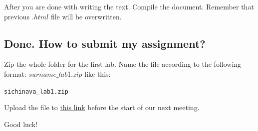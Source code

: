 \documentclass{article}\usepackage[]{graphicx}\usepackage[]{color}
\makeatletter
\newcommand{\hlstd}[1]{\textcolor[rgb]{0.345,0.345,0.345}{#1}}%
\newenvironment{kframe}{%
 \def\at@end@of@kframe{}%
 \ifinner\ifhmode%
  \def\at@end@of@kframe{\end{minipage}}%
  \begin{minipage}{\columnwidth}%
 \fi\fi%
 \def\FrameCommand##1{\hskip\@totalleftmargin \hskip-\fboxsep
 \colorbox{shadecolor}{##1}\hskip-\fboxsep
     \hskip-\linewidth \hskip-\@totalleftmargin \hskip\columnwidth}%
 \MakeFramed {\advance\hsize-\width
   \@totalleftmargin\z@ \linewidth\hsize
   \@setminipage}}%
 {\par\unskip\endMakeFramed%
 \at@end@of@kframe}
\newenvironment{knitrout}{}{} %
\makeatother
\begin{document}
After you are done with writing the text. Compile the document. Remember that previous $.html$ file will be overwritten.

\subsection*{Done. How to submit my assignment?}

Zip the whole folder for the first lab. Name the file according to the following format: $surname\_lab1.zip$ like this:

\begin{knitrout}
\color{fgcolor}\begin{kframe}
\begin{alltt}
\hlstd{sichinava_lab1.zip}
\end{alltt}
\end{kframe}
\end{knitrout}

Upload the file to \href{https://www.dropbox.com/request/fJXwi6SVJ0D7r1WvxyG9}{this link} before the start of our next meeting.


Good luck!
\end{document}
